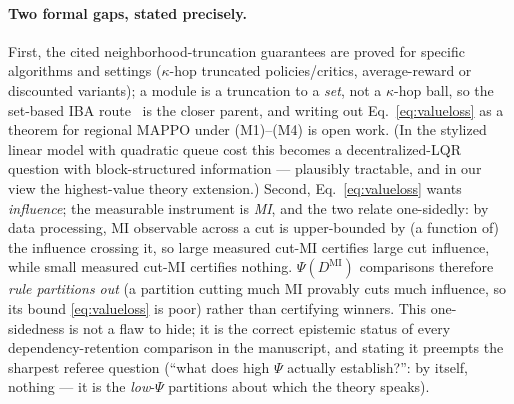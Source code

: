 \documentclass[11pt]{article}
\theoremstyle{definition}
\theoremstyle{remark}
\begin{document}
\paragraph{Two formal gaps, stated precisely.}
First, the cited neighborhood-truncation guarantees are proved for specific
algorithms and settings ($\kappa$-hop truncated policies/critics,
average-reward or discounted variants); a module is a truncation to a
\emph{set}, not a $\kappa$-hop ball, so the set-based IBA
route~\citep{congeduti2021iba} is the closer parent, and writing out
Eq.~\eqref{eq:valueloss} as a theorem for regional MAPPO under (M1)--(M4) is
open work.
(In the stylized linear model with quadratic queue cost this becomes a
decentralized-LQR question with block-structured information --- plausibly
tractable, and in our view the highest-value theory extension.)
Second, Eq.~\eqref{eq:valueloss} wants \emph{influence}; the measurable
instrument is \emph{MI}, and the two relate one-sidedly: by data processing,
MI observable across a cut is upper-bounded by (a function of) the influence
crossing it, so large measured cut-MI certifies large cut influence, while
small measured cut-MI certifies nothing.
$\Psi(D^{\mathrm{MI}})$ comparisons therefore \emph{rule partitions out} (a
partition cutting much MI provably cuts much influence, so its bound
\eqref{eq:valueloss} is poor) rather than certifying winners.
This one-sidedness is not a flaw to hide; it is the correct epistemic status
of every dependency-retention comparison in the manuscript, and stating it
preempts the sharpest referee question (``what does high $\Psi$ actually
establish?'': by itself, nothing --- it is the \emph{low}-$\Psi$ partitions
about which the theory speaks).
\end{document}
